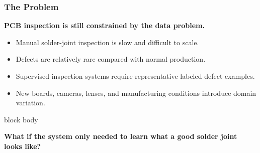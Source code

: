 \documentclass[aspectratio=169,11pt]{beamer}
\newcommand{\emphred}[1]{\textcolor{secondary}{#1}}
\begin{document}
\begin{frame}\frametitle{\emphred{The Problem}}

\vspace{0.25cm}

\begin{center}

{\Large
\textbf{PCB inspection is still constrained by the data problem.}}

\end{center}

\vspace{0.5cm}

\begin{itemize}

    \item
    Manual solder-joint inspection is
    \emphred{slow and difficult to scale}.

    \item
    Defects are relatively rare compared with normal production.

    \item
    Supervised inspection systems require
    \emphred{representative labeled defect examples}.

    \item
    New boards, cameras, lenses, and manufacturing conditions
    introduce domain variation.

\end{itemize}

\vspace{0.6cm}

\begin{beamercolorbox}[
    wd=0.9\paperwidth,
    rounded=true,
    shadow=true,
    sep=0.8em
  ]{block body}

\begin{center}

\large
\textbf{
What if the system only needed to learn what a
good solder joint looks like?
}

\end{center}

\end{beamercolorbox}

\end{frame}
\end{document}
